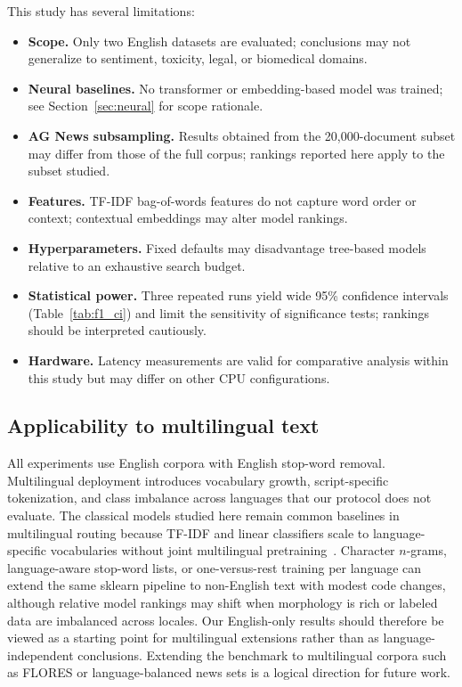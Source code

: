 \documentclass[pdflatex,sn-mathphys-num]{sn-jnl}
\begin{document}
This study has several limitations:
\begin{itemize}
    \item \textbf{Scope.} Only two English datasets are evaluated; conclusions may not generalize to sentiment, toxicity, legal, or biomedical domains.
    \item \textbf{Neural baselines.} No transformer or embedding-based model was trained; see Section~\ref{sec:neural} for scope rationale.
    \item \textbf{AG News subsampling.} Results obtained from the 20{,}000-document subset may differ from those of the full corpus; rankings reported here apply to the subset studied.
    \item \textbf{Features.} TF-IDF bag-of-words features do not capture word order or context; contextual embeddings may alter model rankings.
    \item \textbf{Hyperparameters.} Fixed defaults may disadvantage tree-based models relative to an exhaustive search budget.
    \item \textbf{Statistical power.} Three repeated runs yield wide 95\% confidence intervals (Table~\ref{tab:f1_ci}) and limit the sensitivity of significance tests; rankings should be interpreted cautiously.
    \item \textbf{Hardware.} Latency measurements are valid for comparative analysis within this study but may differ on other CPU configurations.
\end{itemize}

\subsection{Applicability to multilingual text}\label{sec:multilingual}

All experiments use English corpora with English stop-word removal. Multilingual deployment introduces vocabulary growth, script-specific tokenization, and class imbalance across languages that our protocol does not evaluate. The classical models studied here remain common baselines in multilingual routing because TF-IDF and linear classifiers scale to language-specific vocabularies without joint multilingual pretraining~\cite{pissinou2025edge,wang2024atcbench}. Character $n$-grams, language-aware stop-word lists, or one-versus-rest training per language can extend the same sklearn pipeline to non-English text with modest code changes, although relative model rankings may shift when morphology is rich or labeled data are imbalanced across locales. Our English-only results should therefore be viewed as a starting point for multilingual extensions rather than as language-independent conclusions. Extending the benchmark to multilingual corpora such as FLORES or language-balanced news sets is a logical direction for future work.
\end{document}

